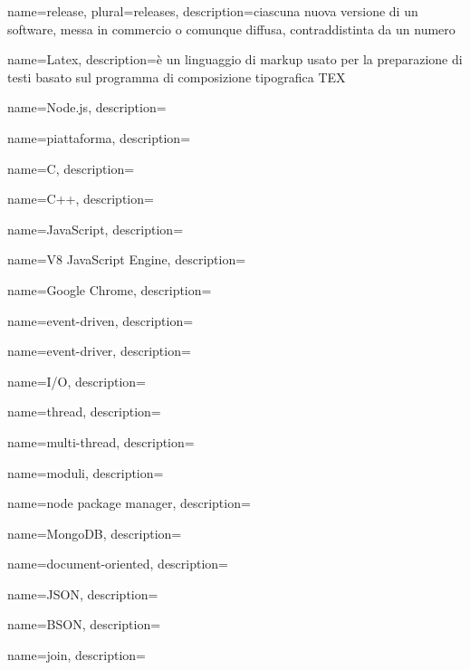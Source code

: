  {
    name=release,
    plural=releases,
    description={ciascuna nuova versione di un software, messa in commercio o comunque diffusa, contraddistinta da un numero}
}

 {
	name=Latex,
	description={è un linguaggio di markup usato per la preparazione di testi basato sul programma di composizione tipografica TEX}
}

 {
	name=Node.js,
	description={\TODO{}}
}

 {
	name=piattaforma,
	description={\TODO{}}
}

 {
	name=C,
	description={\TODO{}}
}

 {
	name=C++,
	description={\TODO{}}
}

 {
	name=JavaScript,
	description={\TODO{}}
}

 {
	name=V8 JavaScript Engine,
	description={\TODO{}}
}

 {
	name=Google Chrome,
	description={\TODO{}}
}

 {
	name=event-driven,
	description={\TODO{}}
}

 {
	name=event-driver,
	description={\TODO{}}
}

 {
	name=I/O,
	description={\TODO{}}
}

 {
	name=thread,
	description={\TODO{}}
}

 {
	name=multi-thread,
	description={\TODO{}}
}

 {
	name=moduli,
	description={\TODO{}}
}

 {
	name=node package manager,
	description={\TODO{}}
}

 {
	name=MongoDB,
	description={\TODO{}}
}

 {
	name=document-oriented,
	description={\TODO{}}
}

 {
	name=JSON,
	description={\TODO{}}
}

 {
	name=BSON,
	description={\TODO{}}
}

 {
	name=join,
	description={\TODO{}}
}

